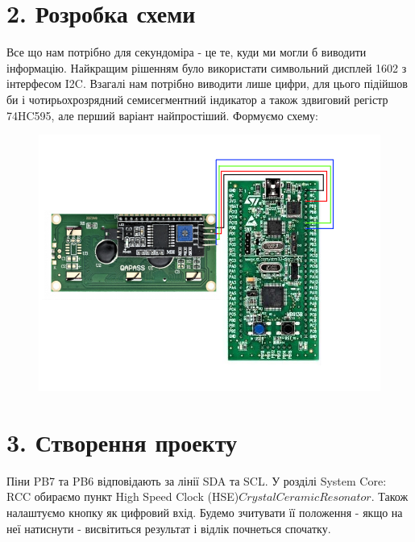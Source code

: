 \documentclass[14pt,a4paper]{scrartcl}
\begin{document}
\section*{\textrm{2. Розробка схеми}}

Все що нам потрібно для секундоміра - це те, куди ми могли б виводити інформацію. Найкращим рішенням було використати символьний дисплей 1602 з інтерфесом I2C. Взагалі нам потрібно виводити лише цифри, для цього підійшов би і чотирьохрозрядний семисегментний індикатор а також здвиговий регістр 74HC595, але перший варіант найпростіший. Формуємо схему: 

\begin{figure}[!h]\TopFloatBoxes\CenterFloatBoxes
{}
{\includegraphics[scale=0.8]{shema.png}}
\end{figure}

\newpage

\section*{\textrm{3. Створення проекту}}

Піни PB7 та PB6 відповідають за лінії SDA та SCL. У розділі System Core: RCC обираємо пункт High Speed Clock (HSE)$\boxed{Crystal Ceramic Resonator}$. Також налаштуємо кнопку як цифровий вхід. Будемо зчитувати її положення - якщо на неї натиснути - висвітиться результат і відлік почнеться спочатку.
\end{document}
